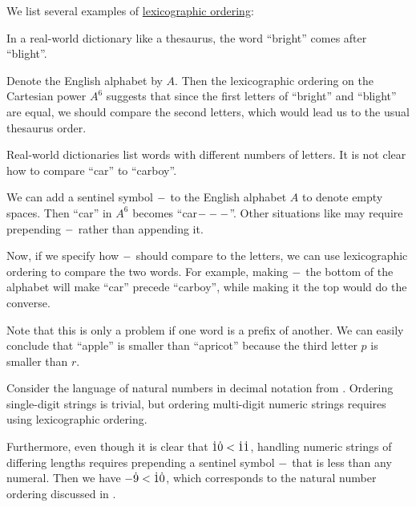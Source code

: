 \begin{example}\label{ex:def:lexicographic_order}
  We list several examples of \hyperref[def:lexicographic_order]{lexicographic ordering}:
  \begin{thmenum}
     In a real-world dictionary like a thesaurus, the word \enquote{bright} comes after \enquote{blight}.

    Denote the English alphabet by \( A \). Then the lexicographic ordering on the Cartesian power \( A^6 \) suggests that since the first letters of \enquote{bright} and \enquote{blight} are equal, we should compare the second letters, which would lead us to the usual thesaurus order.

     Real-world dictionaries list words with different numbers of letters. It is not clear how to compare \enquote{car} to \enquote{carboy}.

    We can add a sentinel symbol \( \anon* \) to the English alphabet \( A \) to denote empty spaces. Then \enquote{car} in \( A^6 \) becomes \enquote{car\( \anon* \anon* \anon* \)}. Other situations like  may require prepending \( \anon* \) rather than appending it.

    Now, if we specify how \( \anon* \) should compare to the letters, we can use lexicographic ordering to compare the two words. For example, making \( \anon* \) the bottom of the alphabet will make \enquote{car} precede \enquote{carboy}, while making it the top would do the converse.

    Note that this is only a problem if one word is a prefix of another. We can easily conclude that \enquote{apple} is smaller than \enquote{apricot} because the third letter \( p \) is smaller than \( r \).

     Consider the language of natural numbers in decimal notation from . Ordering single-digit strings is trivial, but ordering multi-digit numeric strings requires using lexicographic ordering.

    Furthermore, even though it is clear that \( \dot{1} \dot{0} < \dot{1} \dot{1} \), handling numeric strings of differing lengths requires prepending a sentinel symbol \( \anon* \) that is less than any numeral. Then we have \( \anon* \syn9 < \syn1 \syn0 \), which corresponds to the natural number ordering discussed in .


\end{thmenum}
\end{example}
